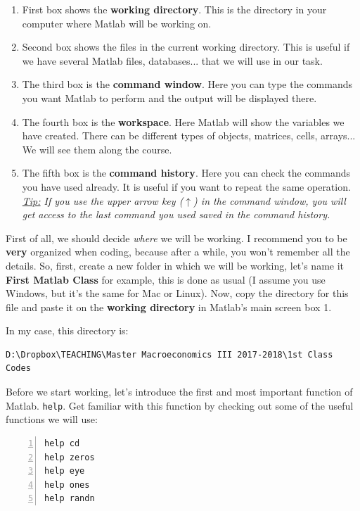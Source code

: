 \documentclass[a4paper,11pt]{article}
\begin{document}
\begin{enumerate}
	\item First box shows the \textbf{working directory}. This is the directory in your computer where Matlab will be working on.
	\item Second box shows the files in the current working directory. This is useful if we have several Matlab files, databases... that we will use in our task.
	\item The third box is the \textbf{command window}. Here you can type the commands you want Matlab to perform and the output will be displayed there.
	\item The fourth box is the \textbf{workspace}. Here Matlab will show the variables we have created. There can be different types of objects, matrices, cells, arrays... We will see them along the course.
	\item The fifth box is the \textbf{command history}. Here you can check the commands you have used already. It is useful if you want to repeat the same operation. \textit{\underline{Tip:} If you use the upper arrow key ($\uparrow$) in the command window, you will get access to the last command you used saved in the command history.}
\end{enumerate}

First of all, we should decide \textit{where} we will be working. I recommend you to be \textbf{very} organized when coding, because after a while, you won't remember all the details. So, first, create a new folder in which we will be working, let's name it \textbf{First Matlab Class} for example, this is done as usual (I assume you use Windows, but it's the same for Mac or Linux). Now, copy the directory for this file and paste it on the \textbf{working directory} in Matlab's main screen box 1.

In my case, this directory is:

\begin{Verbatim}[fontsize = \small]
D:\Dropbox\TEACHING\Master Macroeconomics III 2017-2018\1st Class Codes
\end{Verbatim}

Before we start working, let's introduce the first and most important function of Matlab. \verb;help;. Get familiar with this function by checking out some of the useful functions we will use:

\begin{Verbatim}[numbers = left,fontsize=\small]
help cd
help zeros
help eye
help ones
help randn
\end{Verbatim}
\end{document}
